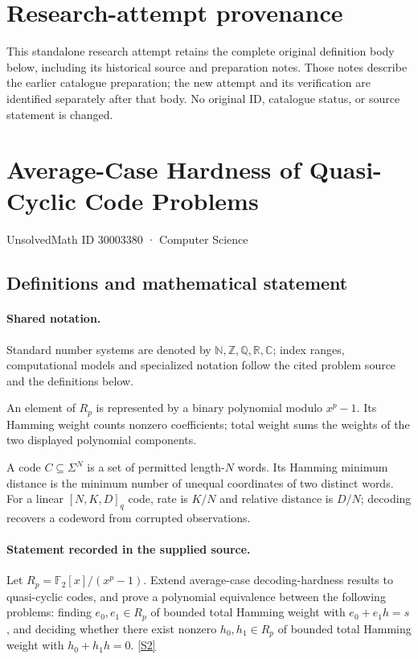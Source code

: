\documentclass[11pt]{article}
\begin{document}
\section*{Research-attempt provenance}
This standalone research attempt retains the complete original definition body below,
including its historical source and preparation notes. Those notes describe the
earlier catalogue preparation; the new attempt and its verification are identified
separately after that body. No original ID, catalogue status, or source statement is changed.

\section{Average-Case Hardness of Quasi-Cyclic Code Problems}\label{30003380}
{\small UnsolvedMath ID 30003380 · Computer Science}
\subsection{Definitions and mathematical statement}

\paragraph{Shared notation.}Standard number systems are denoted by $\mathbb N,\mathbb Z,\mathbb Q,\mathbb R,\mathbb C$; index ranges, computational models and specialized notation follow the cited problem source and the definitions below.


An element of $R_p$ is represented by a binary polynomial modulo $x^p-1$. Its Hamming weight counts nonzero coefficients; total weight sums the weights of the two displayed polynomial components.

A code $C\subseteq\Sigma^N$ is a set of permitted length-$N$ words. Its Hamming minimum distance is the minimum number of unequal coordinates of two distinct words. For a linear $[N,K,D]_q$ code, rate is $K/N$ and relative distance is $D/N$; decoding recovers a codeword from corrupted observations.
\paragraph{Statement recorded in the supplied source.}
Let $R_p=\mathbb F_2[x]/(x^p-1)$. Extend average-case decoding-hardness results to quasi-cyclic codes, and prove a polynomial equivalence between the following problems: finding $e_0,e_1\in R_p$ of bounded total Hamming weight with $e_0+e_1h=s$, and deciding whether there exist nonzero $h_0,h_1\in R_p$ of bounded total Hamming weight with $h_0+h_1h=0$. \href{https://doi.org/10.4171/owr/2017/5}{[S2]}
\end{document}
